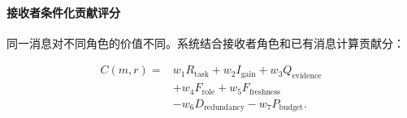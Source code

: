 





\paragraph{接收者条件化贡献评分}

同一消息对不同角色的价值不同。系统结合接收者角色和已有消息计算贡献分：


\begin{equation}
\begin{aligned}
    C(m,r)
    ={}&
    w_1R_{\mathrm{task}}
    +w_2I_{\mathrm{gain}}
    +w_3Q_{\mathrm{evidence}}\\
    &+w_4F_{\mathrm{role}}
    +w_5F_{\mathrm{freshness}}\\
    &-w_6D_{\mathrm{redundancy}}
    -w_7P_{\mathrm{budget}}.
\end{aligned}
\end{equation}

